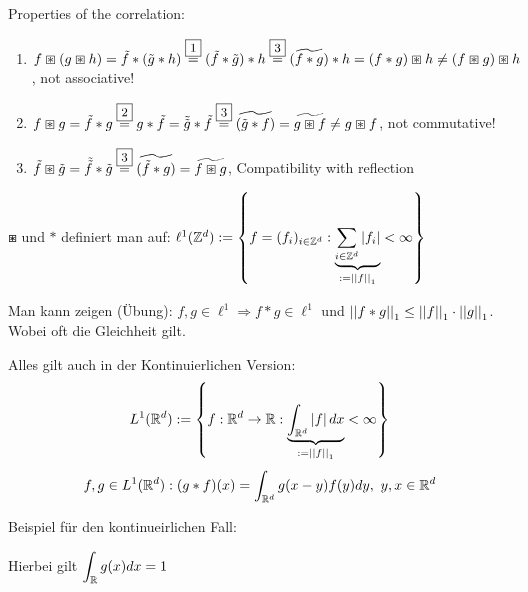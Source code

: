 		Properties of the correlation:
		\begin{enumerate}
			\item $f \boxast (g \boxast h) = \tilde f * ( \tilde g* h) 
				\overset{\framebox{\small 1}}{=} ( \tilde f * \tilde g) * h
				\overset{\framebox{\small 3}}{=} (\widetilde{f * g}) * h = 
				(f * g) \boxast h \neq (f \boxast g) \boxast h$, not associative!
			\item $f \boxast g = \tilde f * g \overset{
				\framebox{\small 2}}{=} g * \tilde f = 
					\tilde{\tilde g} * \tilde f \overset{\framebox{\small 3}}{=}
					\widetilde{(\tilde g * f)} = 
					\widetilde{g \boxast f} \neq g \boxast f$, not commutative!
			\item $\tilde f \boxast \tilde g = 
				\tilde{\tilde f} * \tilde g \overset{\framebox{\small 3}}{=}
				\widetilde{(\tilde f * g)} = \widetilde{f \boxast g}$, 
				Compatibility with reflection
		\end{enumerate}

		$\boxast$ und $*$ definiert man auf: 
			$\ell^1(\mathbb{Z}^d):=\left\{f=(f_i)_{i \in \mathbb{Z}^d} : \underbrace{\sum_{
				i \in \mathbb{Z}^d}\left\lvert f_i \right\rvert}_{:=\left\lvert \left\lvert f \right\rvert \right\rvert_1} < \infty\right\}$
		
			Man kann zeigen (Übung): $f,g \in \ell^1 \Rightarrow f * g \in \ell^1$ 
			und $\left\lvert \left\lvert f * g \right\rvert \right\rvert_1 \leq \left\lvert \left\lvert f \right\rvert \right\rvert_1 \cdot \left\lvert \left\lvert g \right\rvert \right\rvert_1$.
			Wobei oft die Gleichheit gilt.
			
			Alles gilt auch in der Kontinuierlichen Version:
			\[L^1(\mathbb{R}^d) := \left\{f:\mathbb{R}^d \to \mathbb{R} : 
				\underbrace{\int_{\mathbb{R}^d}\left\lvert f \right\rvert dx}_{:=\left\lvert \left\lvert f \right\rvert \right\rvert_1} < \infty\right\} \]
			\[f,g \in L^1(\mathbb{R}^d): (g*f)(x)=\int_{\mathbb{R}^d}g(x-y)f(y) dy, \ y,x \in \mathbb{R}^d\]
		
			Beispiel für den kontinueirlichen Fall:
			\begin{center}
			\end{center}
			Hierbei gilt $\displaystyle \int_{\mathbb{R}} g(x) dx = 1$
		
			\begin{center}
			\end{center}
		
